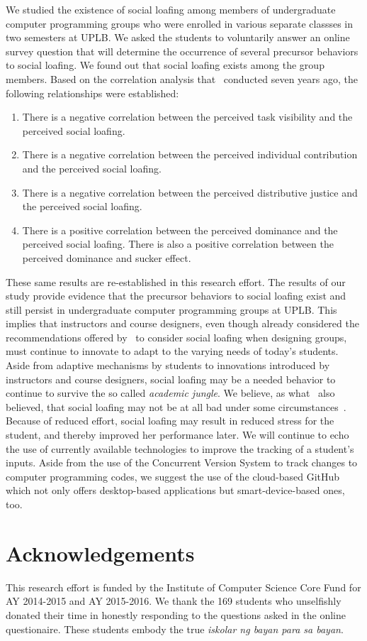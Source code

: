 \documentclass[a4paper,a4paper,BCOR12mm,12pt,abstracton,pointednumbers,tablecaptionabove,footinclude,halfparskip,normalheadings,]{scrartcl}
\begin{document}
We studied the existence of social loafing among members of undergraduate computer programming groups who were enrolled in various separate classses in two semesters at UPLB. We asked the students to voluntarily answer an online survey question that will determine the occurrence of several precursor behaviors to social loafing. We found out that social loafing exists among the group members. Based on the correlation analysis that~\citet{Pabico08} conducted seven years ago, the following relationships were established: 
\begin{enumerate}
\item There is a negative correlation between the perceived task visibility and the perceived social loafing. 
\item There is a negative correlation between the perceived individual contribution and the perceived social loafing. 
\item There is a negative correlation between the perceived distributive justice and the perceived social loafing. 
\item There is a positive correlation between the perceived dominance and the perceived social loafing. There is also a positive correlation between the perceived dominance and sucker effect. 
\end{enumerate}

These same results are re-established in this research effort. The results of our study provide evidence that the precursor behaviors to social loafing exist and  still persist in undergraduate computer programming groups at UPLB. This implies that instructors and course designers, even though already considered the recommendations offered by~\citet{Pabico08} to consider social loafing when designing groups, must continue to innovate to adapt to the varying needs of today's students. Aside from adaptive mechanisms by students to innovations introduced by instructors and course designers, social loafing may be a needed behavior to continue to survive the so called {\em academic jungle}. We believe, as what~\citet{Pabico08} also believed, that social loafing may not be at all bad under some circumstances~\citep{Jackson85}. Because of reduced effort, social loafing may result in reduced stress for the student, and thereby improved her performance later. We will continue to echo the use of currently available technologies to improve the tracking of a student's inputs. Aside from the use of the Concurrent Version System to track changes to computer programming codes, we suggest the use of the cloud-based GitHub which not only offers desktop-based applications but smart-device-based ones, too.

\section*{Acknowledgements}

This research effort is funded by the Institute of Computer Science Core Fund for AY 2014-2015 and AY 2015-2016. We thank the 169 students who unselfishly donated their time in honestly responding to the questions asked in the online questionaire. These students embody the true {\em iskolar ng bayan para sa bayan}.



\end{document}
